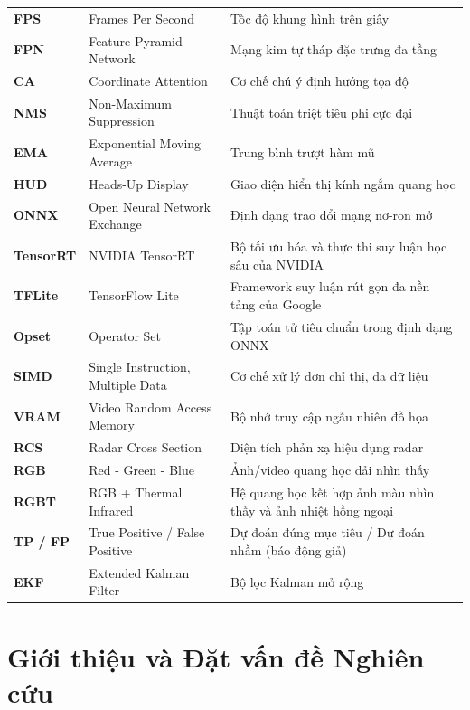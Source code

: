 \documentclass[11pt,a4paper]{article}
\begin{document}
\begin{table}[H]
{\begin{tabular}{lll}
\textbf{FPS} & Frames Per Second & Tốc độ khung hình trên giây \\
\textbf{FPN} & Feature Pyramid Network & Mạng kim tự tháp đặc trưng đa tầng \\
\textbf{CA} & Coordinate Attention & Cơ chế chú ý định hướng tọa độ \\
\textbf{NMS} & Non-Maximum Suppression & Thuật toán triệt tiêu phi cực đại \\
\textbf{EMA} & Exponential Moving Average & Trung bình trượt hàm mũ \\
\textbf{HUD} & Heads-Up Display & Giao diện hiển thị kính ngắm quang học \\
\textbf{ONNX} & Open Neural Network Exchange & Định dạng trao đổi mạng nơ-ron mở \\
\textbf{TensorRT} & NVIDIA TensorRT & Bộ tối ưu hóa và thực thi suy luận học sâu của NVIDIA \\
\textbf{TFLite} & TensorFlow Lite & Framework suy luận rút gọn đa nền tảng của Google \\
\textbf{Opset} & Operator Set & Tập toán tử tiêu chuẩn trong định dạng ONNX \\
\textbf{SIMD} & Single Instruction, Multiple Data & Cơ chế xử lý đơn chỉ thị, đa dữ liệu \\
\textbf{VRAM} & Video Random Access Memory & Bộ nhớ truy cập ngẫu nhiên đồ họa \\
\textbf{RCS} & Radar Cross Section & Diện tích phản xạ hiệu dụng radar \\
\textbf{RGB} & Red - Green - Blue & Ảnh/video quang học dải nhìn thấy \\
\textbf{RGBT} & RGB + Thermal Infrared & Hệ quang học kết hợp ảnh màu nhìn thấy và ảnh nhiệt hồng ngoại \\
\textbf{TP / FP} & True Positive / False Positive & Dự đoán đúng mục tiêu / Dự đoán nhầm (báo động giả) \\
\textbf{EKF} & Extended Kalman Filter & Bộ lọc Kalman mở rộng \\
\bottomrule
\end{tabular}%
}
\end{table}
\newpage

\section{Giới thiệu và Đặt vấn đề Nghiên cứu}
\end{document}
